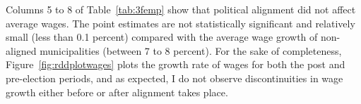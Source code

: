 \documentclass[dv_diss_main.tex]{subfiles}
\begin{document}
Columns 5 to 8 of Table~\ref{tab:3femp} show that political alignment did not affect average wages. The point estimates are not statistically significant and relatively small (less than 0.1 percent) compared with the average wage growth of non-aligned municipalities (between 7 to 8 percent). For the sake of completeness, Figure~\ref{fig:rddplotwages} plots the growth rate of wages for both the post and pre-election periods, and as expected, I do not observe discontinuities in wage growth either before or after alignment takes place. 
\end{document}
